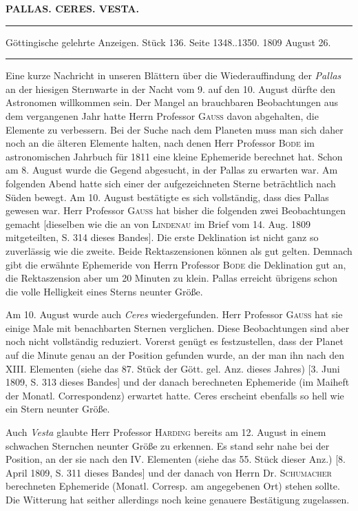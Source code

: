 \clearpage
{}
\begin{center}
\textbf{PALLAS. CERES. VESTA.}
\par\vspace{4pt}\hrule\vspace{4pt}
\fontsize{10}{12}\selectfont Göttingische gelehrte Anzeigen. Stück 136. Seite 1348..1350. 1809 August 26.
\par\vspace{4pt}\hrule\vspace{4pt}
\end{center}

\par\indent Eine kurze Nachricht in unseren Blättern über die Wiederauffindung der \emph{Pallas} an der hiesigen Sternwarte in der Nacht vom 9. auf den 10. August dürfte den Astronomen willkommen sein. Der Mangel an brauchbaren Beobachtungen aus dem vergangenen Jahr hatte Herrn Professor \textsc{Gauss} davon abgehalten, die Elemente zu verbessern. Bei der Suche nach dem Planeten muss man sich daher noch an die älteren Elemente halten, nach denen Herr Professor \textsc{Bode} im astronomischen Jahrbuch für 1811 eine kleine Ephemeride berechnet hat. Schon am 8. August wurde die Gegend abgesucht, in der Pallas zu erwarten war. Am folgenden Abend hatte sich einer der aufgezeichneten Sterne beträchtlich nach Süden bewegt. Am 10. August bestätigte es sich vollständig, dass dies Pallas gewesen war. Herr Professor \textsc{Gauss} hat bisher die folgenden zwei Beobachtungen gemacht [dieselben wie die an von \textsc{Lindenau} im Brief vom 14. Aug. 1809 mitgeteilten, S. 314 dieses Bandes]. Die erste Deklination ist nicht ganz so zuverlässig wie die zweite. Beide Rektaszensionen können als gut gelten. Demnach gibt die erwähnte Ephemeride von Herrn Professor \textsc{Bode} die Deklination gut an, die Rektaszension aber um 20 Minuten zu klein. Pallas erreicht übrigens schon die volle Helligkeit eines Sterns neunter Größe.

\par\indent Am 10. August wurde auch \emph{Ceres} wiedergefunden. Herr Professor \textsc{Gauss} hat sie einige Male mit benachbarten Sternen verglichen. Diese Beobachtungen sind aber noch nicht vollständig reduziert. Vorerst genügt es festzustellen, dass der Planet auf die Minute genau an der Position gefunden wurde, an der man ihn nach den XIII. Elementen (siehe das 87. Stück der Gött. gel. Anz. dieses Jahres) [3. Juni 1809, S. 313 dieses Bandes] und der danach berechneten Ephemeride (im Maiheft der Monatl. Correspondenz) erwartet hatte. Ceres erscheint ebenfalls so hell wie ein Stern neunter Größe.

\par\indent Auch \emph{Vesta} glaubte Herr Professor \textsc{Harding} bereits am 12. August in einem schwachen Sternchen neunter Größe zu erkennen. Es stand sehr nahe bei der Position, an der sie nach den IV. Elementen (siehe das 55. Stück dieser Anz.) [8. April 1809, S. 311 dieses Bandes] und der danach von Herrn Dr. \textsc{Schumacher} berechneten Ephemeride (Monatl. Corresp. am angegebenen Ort) stehen sollte. Die Witterung hat seither allerdings noch keine genauere Bestätigung zugelassen.
